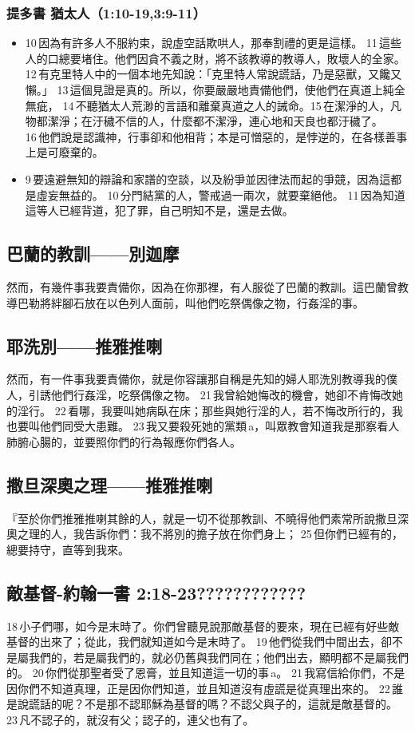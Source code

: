 \subsubsection{提多書  猶太人（1:10-19,3:9-11） } 
  \begin{itemize}
 \itemsep-.25em
\item  10 因為有許多人不服約束，說虛空話欺哄人，那奉割禮的更是這樣。 11 這些人的口總要堵住。他們因貪不義之財，將不該教導的教導人，敗壞人的全家。 12 有克里特人中的一個本地先知說：「克里特人常說謊話，乃是惡獸，又饞又懶。」 13 這個見證是真的。所以，你要嚴嚴地責備他們，使他們在真道上純全無疵， 14 不聽猶太人荒渺的言語和離棄真道之人的誡命。15 在潔淨的人，凡物都潔淨；在汙穢不信的人，什麼都不潔淨，連心地和天良也都汙穢了。 16 他們說是認識神，行事卻和他相背；本是可憎惡的，是悖逆的，在各樣善事上是可廢棄的。
 \item  9 要遠避無知的辯論和家譜的空談，以及紛爭並因律法而起的爭競，因為這都是虛妄無益的。 10 分門結黨的人，警戒過一兩次，就要棄絕他。 11 因為知道這等人已經背道，犯了罪，自己明知不是，還是去做。
 \end{itemize}
   
    
 \subsection{巴蘭的教訓——別迦摩}
 然而，有幾件事我要責備你，因為在你那裡，有人服從了巴蘭的教訓。這巴蘭曾教導巴勒將絆腳石放在以色列人面前，叫他們吃祭偶像之物，行姦淫的事。
 
 \subsection{耶洗別——推雅推喇}
 然而，有一件事我要責備你，就是你容讓那自稱是先知的婦人耶洗別教導我的僕人，引誘他們行姦淫，吃祭偶像之物。 21 我曾給她悔改的機會，她卻不肯悔改她的淫行。 22 看哪，我要叫她病臥在床；那些與她行淫的人，若不悔改所行的，我也要叫他們同受大患難。 23 我又要殺死她的黨類 a，叫眾教會知道我是那察看人肺腑心腸的，並要照你們的行為報應你們各人。
 
 \subsection{撒旦深奧之理——推雅推喇} 
 『至於你們推雅推喇其餘的人，就是一切不從那教訓、不曉得他們素常所說撒旦深奧之理的人，我告訴你們：我不將別的擔子放在你們身上； 25 但你們已經有的，總要持守，直等到我來。
 
 \subsection{敵基督-約翰一書 2:18-23????????????} 
18 小子們哪，如今是末時了。你們曾聽見說那敵基督的要來，現在已經有好些敵基督的出來了；從此，我們就知道如今是末時了。 19 他們從我們中間出去，卻不是屬我們的，若是屬我們的，就必仍舊與我們同在；他們出去，顯明都不是屬我們的。 20 你們從那聖者受了恩膏，並且知道這一切的事 a。 21 我寫信給你們，不是因你們不知道真理，正是因你們知道，並且知道沒有虛謊是從真理出來的。 22 誰是說謊話的呢？不是那不認耶穌為基督的嗎？不認父與子的，這就是敵基督的。 23 凡不認子的，就沒有父；認子的，連父也有了。
